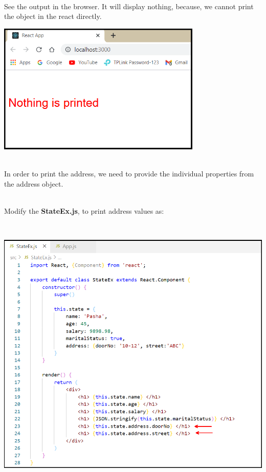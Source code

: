 \documentclass{article}
\begin{document}
\noindent 

\noindent \\
See the output in the browser. It will display nothing, because, we cannot print the object in the react directly.

\noindent 

\begin{center}
	\noindent \includegraphics*[width=3.83in, height=2.46in]{IMG-09-08}
\end{center}

\noindent 

\noindent 

\noindent \\
In order to print the address, we need to provide the individual properties from the address object.

\noindent 

\noindent 

\noindent 

\noindent \\
Modify the \textbf{StateEx.js}, to print address values as:

\begin{center}
	\noindent \includegraphics*[width=6.02in, height=5.33in]{IMG-09-09}
\end{center}
\end{document}
